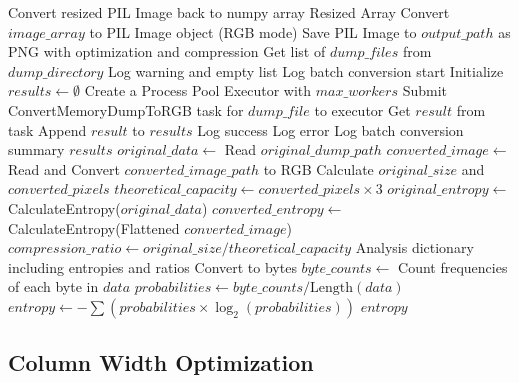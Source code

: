 \begin{algorithm}[!htbp]
\begin{algorithmic}[1]
    \State Convert resized PIL Image back to numpy array
    \Return Resized Array
\EndProcedure
\Statex
{}
    \State Convert $image\_array$ to PIL Image object (RGB mode)
    \State Save PIL Image to $output\_path$ as PNG with optimization and compression
\EndProcedure
\Statex
{}
    \State Get list of $dump\_files$ from $dump\_directory$
     Log warning and \Return empty list \EndIf
    \State Log batch conversion start
    \State Initialize $results \leftarrow \emptyset$
    \State Create a Process Pool Executor with $max\_workers$
        \State Submit ConvertMemoryDumpToRGB task for $dump\_file$ to executor
    \EndFor
        \State Get $result$ from task
        \State Append $result$ to $results$
         Log success
        \Else
            \State Log error
        \EndIf
    \EndFor
    \State Log batch conversion summary
    \Return $results$
\EndProcedure
\Statex
{}
    \State $original\_data \leftarrow$ Read $original\_dump\_path$
    \State $converted\_image \leftarrow$ Read and Convert $converted\_image\_path$ to RGB
    \State Calculate $original\_size$ and $converted\_pixels$
    \State $theoretical\_capacity \leftarrow converted\_pixels \times 3$
    \State $original\_entropy \leftarrow$ CalculateEntropy($original\_data$)
    \State $converted\_entropy \leftarrow$ CalculateEntropy(Flattened $converted\_image$)
    \State $compression\_ratio \leftarrow original\_size / theoretical\_capacity$
    \Return Analysis dictionary including entropies and ratios
\EndProcedure
\Statex
{}
     Convert to bytes \EndIf
    \State $byte\_counts \leftarrow$ Count frequencies of each byte in $data$
    \State $probabilities \leftarrow byte\_counts / \text{Length}(data)$
    \State $entropy \leftarrow -\sum (probabilities \times \log_2(probabilities))$
    \Return $entropy$
\EndProcedure
\end{algorithmic}
\end{algorithm}

\subsection{Column Width Optimization}
\label{subsec:column-width}

